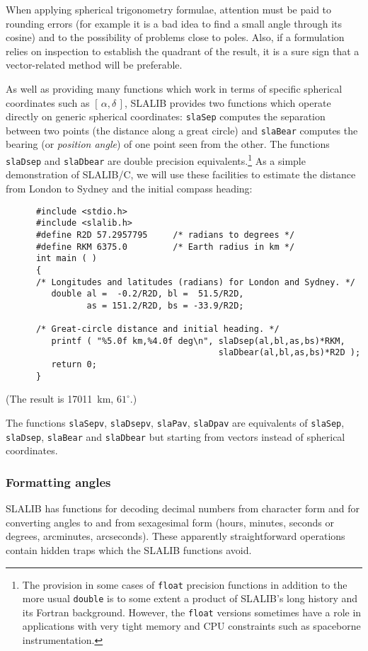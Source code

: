 \documentclass[11pt,fleqn,twoside]{article}
\renewcommand{\_}{{\tt\char'137}}     %
\newcommand{\radec}     {$[\,\alpha,\delta\,]$}
\begin{document}
When applying spherical trigonometry formulae, attention must be
paid to
rounding errors (for example it is a bad idea to find a
small angle through its cosine) and to the possibility of
problems close to poles.
Also, if a formulation relies on inspection to establish
the quadrant of the result, it is a sure sign that a vector-related
method will be preferable.
 
As well as providing many functions which work in terms of specific
spherical coordinates such as \radec, SLALIB provides
two functions which operate directly on generic spherical
coordinates:
{\tt slaSep}
computes the separation between
two points (the distance along a great circle) and
{\tt slaBear}
computes the bearing (or {\it position angle})
of one point seen from the other.  The functions
{\tt slaDsep}
and
{\tt slaDbear}
are double precision equivalents.\footnote{The provision
in some cases of {\tt float}
precision functions in addition to the more usual {\tt double} is to
some extent a product of SLALIB's long history and its Fortran
background.  However, the {\tt float} versions sometimes have a role
in applications with very tight memory and CPU constraints such
as spaceborne instrumentation.}
As a simple demonstration
of SLALIB/C, we will use these facilities to estimate the distance from
London to Sydney and the initial compass heading:
\goodbreak
\vspace{-3ex}
\begin{verbatim}
      #include <stdio.h>
      #include <slalib.h>
      #define R2D 57.2957795     /* radians to degrees */
      #define RKM 6375.0         /* Earth radius in km */
      int main ( )
      {
      /* Longitudes and latitudes (radians) for London and Sydney. */
         double al =  -0.2/R2D, bl =  51.5/R2D,
                as = 151.2/R2D, bs = -33.9/R2D;

      /* Great-circle distance and initial heading. */
         printf ( "%5.0f km,%4.0f deg\n", slaDsep(al,bl,as,bs)*RKM,
                                          slaDbear(al,bl,as,bs)*R2D );
         return 0;
      }
\end{verbatim}
\vspace{-3ex}
(The result is 17011~km, $61^\circ$.)
 
The functions
{\tt slaSepv},
{\tt slaDsepv},
{\tt slaPav},
{\tt slaDpav}
are equivalents of
{\tt slaSep},
{\tt slaDsep},
{\tt slaBear} and
{\tt slaDbear}
but starting from vectors instead of spherical coordinates.

\subsubsection{Formatting angles}
SLALIB has functions for decoding decimal numbers
from character form and for converting angles to and from
sexagesimal form (hours, minutes, seconds or degrees,
arcminutes, arcseconds).  These apparently straightforward
operations contain hidden traps which the SLALIB functions avoid.
 
\end{document}
